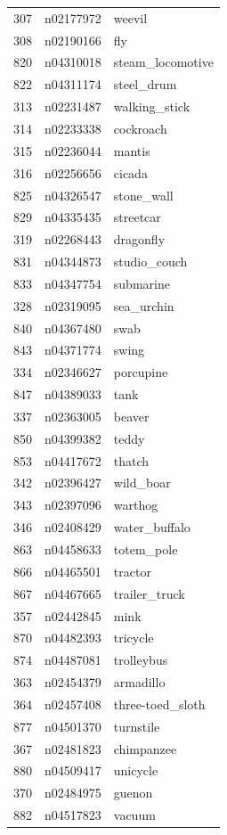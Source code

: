 \begin{table}
\begin{tabular}{cll}
307 & n02177972 & weevil \\
308 & n02190166 & fly \\
820 & n04310018 & steam_locomotive \\
822 & n04311174 & steel_drum \\
313 & n02231487 & walking_stick \\
314 & n02233338 & cockroach \\
315 & n02236044 & mantis \\
316 & n02256656 & cicada \\
825 & n04326547 & stone_wall \\
829 & n04335435 & streetcar \\
319 & n02268443 & dragonfly \\
831 & n04344873 & studio_couch \\
833 & n04347754 & submarine \\
328 & n02319095 & sea_urchin \\
840 & n04367480 & swab \\
843 & n04371774 & swing \\
334 & n02346627 & porcupine \\
847 & n04389033 & tank \\
337 & n02363005 & beaver \\
850 & n04399382 & teddy \\
853 & n04417672 & thatch \\
342 & n02396427 & wild_boar \\
343 & n02397096 & warthog \\
346 & n02408429 & water_buffalo \\
863 & n04458633 & totem_pole \\
866 & n04465501 & tractor \\
867 & n04467665 & trailer_truck \\
357 & n02442845 & mink \\
870 & n04482393 & tricycle \\
874 & n04487081 & trolleybus \\
363 & n02454379 & armadillo \\
364 & n02457408 & three-toed_sloth \\
877 & n04501370 & turnstile \\
367 & n02481823 & chimpanzee \\
880 & n04509417 & unicycle \\
370 & n02484975 & guenon \\
882 & n04517823 & vacuum \\

\end{tabular}
\end{table}

